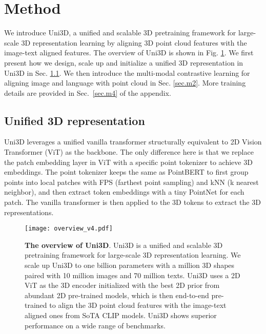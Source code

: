 \documentclass{article} \usepackage{iclr2024_conference,times}
\def\Ours{Uni3D\xspace}
\begin{document}
\section{Method}

We introduce \Ours, a unified and scalable 3D pretraining framework for large-scale 3D representation learning by aligning 3D point cloud features with the image-text aligned features. The overview of \Ours is shown in Fig. \ref{fig:overview}. We first present how we design, scale up and initialize a unified 3D representation in \Ours in Sec. \ref{sec.m1}. We then introduce the multi-modal contrastive learning for aligning image and language with point cloud in Sec. \ref{sec.m2}. More training details are provided in Sec.~\ref{sec.m4} of the appendix.


\subsection{Unified 3D representation}
\label{sec.m1}
\Ours leverages a unified vanilla transformer structurally equivalent to 2D Vision Transformer (ViT) \citep{dosovitskiy2020image} as the backbone. The only difference here is that we replace the patch embedding layer in ViT with a specific point tokenizer to achieve 3D embeddings. The point tokenizer keeps the same as PointBERT \citep{yu2022point} to first group points into local patches with FPS (farthest point sampling) and kNN (k nearest neighbor), and then extract token embeddings with a tiny PointNet \citep{qi2017pointnet} for each patch. The vanilla transformer is then applied to the 3D tokens to extract the 3D representations. 

\begin{figure}[tb]
    \centering
    \texttt{[image: overview\_v4.pdf]}
    \caption{\textbf{The overview of \Ours}. \Ours is a unified and scalable 3D pretraining framework for large-scale 3D representation learning. We scale up \Ours to one billion parameters with a million 3D shapes paired with 10 million images and 70 million texts. Uni3D uses a 2D ViT as the 3D encoder initialized with the best 2D prior from abundant 2D pre-trained models, which is then end-to-end pre-trained to align the 3D point cloud features with the image-text aligned ones from SoTA CLIP models. \Ours shows superior performance on a wide range of benchmarks.}
    \label{fig:overview}
    \vspace{-0.3cm}
\end{figure}
\end{document}
